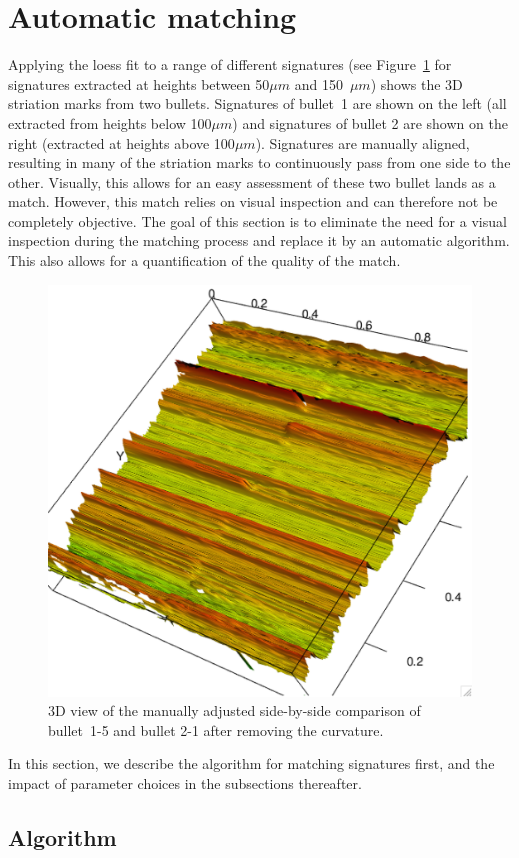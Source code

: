\documentclass[aoas, preprint]{imsart}\usepackage[]{graphicx}\usepackage[]{color}
\begin{document}
\section{Automatic matching}
Applying the loess fit to a range of different signatures (see Figure~\ref{fig:manualmatch-rgl} for signatures extracted at heights between 50$\mu m$ and 150~$\mu m$) shows the 3D striation marks from two bullets. Signatures of bullet~1 are shown on the left (all extracted from heights below 100$\mu m$) and signatures of bullet 2 are shown on the right (extracted at heights above 100$\mu m$). Signatures are manually aligned, resulting in many of the striation marks to continuously pass from one side to the other. Visually, this allows for an easy assessment of these two bullet lands as a match. However, this match relies on visual inspection and can therefore not be completely objective.  The goal of this section is to eliminate the need for a visual inspection during the matching process and replace it by an automatic algorithm. This also allows for a quantification of the quality of the match.

\begin{figure}[hbtp]
\centering
\includegraphics[width=.65\columnwidth]{images/matchup-rgl.png}
\caption{\label{fig:manualmatch-rgl}3D view of the manually adjusted side-by-side comparison of bullet~1-5 and bullet 2-1 after removing the curvature.}
\end{figure}

In this section, we describe the algorithm for matching signatures first, and the impact of parameter choices in the subsections thereafter.


\subsection{Algorithm}\label{sec:algorithm}
\end{document}
